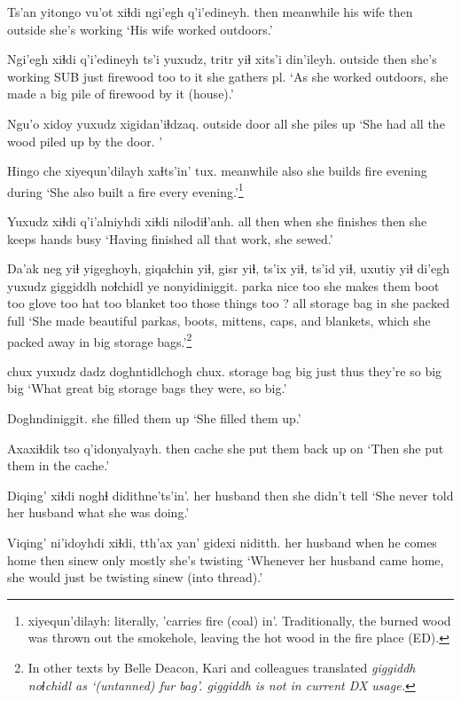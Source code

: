 \documentclass[12pt]{article}
\begin{document}
\gll Ts'an yitongo vu'ot xiɬdi ngi'egh q'i'edineyh. 
then meanwhile {his wife} then {outside} {she's working}
\glt `His wife worked outdoors.'
\glend

\gll Ngi'egh xiɬdi q'i'edineyh ts'i yuxudz, tritr yiɬ xits'i {din'ileyh.} 
outside then {she's working} SUB just {firewood} too {to it} {she gathers pl.}
\glt `As she worked outdoors, she made a big pile of firewood by it (house).'
\glend

\gll Ngu'o xidoy yuxudz xigidan'iɬdzaq. 
outside door all {she piles up}
\glt `She had all the wood piled up by the door. '
\glend

\gll Hingo che xiyequn'dilayh xaɬts'in' tux. 
meanwhile also {she builds fire} evening during
\glt `She also built a fire every evening.'\footnote{xiyequn'dilayh: literally, 'carries fire (coal) in'. Traditionally, the burned wood was thrown out the smokehole, leaving the hot wood in the fire place (ED).}
\glend

\gll Yuxudz xiɬdi q'i'alniyhdi xiɬdi nilodiɬ'anh. 
all then {when she finishes} then {she keeps hands busy}
\glt `Having finished all that work, she sewed.'
\glend

\gll Da'ak neg yiɬ {yigeghoyh}, giqaɬchin yiɬ, gisr yiɬ, ts'ix yiɬ, ts'id yiɬ, uxutiy yiɬ di'egh yuxudz {giggiddh noɬchidl} ye nonyidiniggit.
parka nice too {she makes them} boot too glove too hat too blanket too {those things} too ? all {storage bag} in {she packed full}
\glt `She made beautiful parkas, boots, mittens, caps, and blankets, which she packed away in big storage bags.'\footnote{In other texts by Belle Deacon, Kari and colleagues translated \em giggiddh noɬchidl \em as `(untanned) fur bag'.  \em giggiddh \em is not in current DX usage.}
\glend

 chux yuxudz dadz doghntidlchogh chux. 
{storage bag} big just thus {they're so big} big
\glt `What great big storage bags they were, so big.'
\glend

\gll Doghndiniggit. 
{{she filled them up}}
\glt `She filled them up.'
\glend

\gll Axaxiɬdik tso q'idonyalyayh. 
then cache {she put them back up on}
\glt `Then she put them in the cache.'
\glend

\gll Diqing' xiɬdi {noghɬ didithne'ts'in'.}
{her husband} then {she didn't tell}
\glt `She never told her husband what she was doing.'
\glend

\gll Viqing' ni'idoyhdi xiɬdi, tth'ax yan' gidexi niditth.
{her husband} {when he comes home} then sinew only mostly {she's twisting}
\glt `Whenever her husband came home, she would just be twisting sinew (into thread).'
\glend
\end{document}
